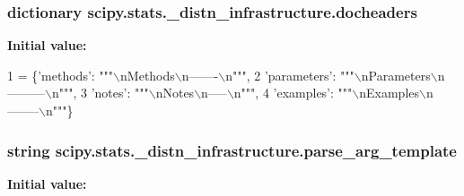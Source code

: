 \subsubsection[{docheaders}]{\setlength{\rightskip}{0pt plus 5cm}dictionary scipy.\+stats.\+\_\+distn\+\_\+infrastructure.\+docheaders}\label{namespacescipy_1_1stats_1_1__distn__infrastructure_aec447665e9947010e795781f414be00e}
{\bfseries Initial value\+:}
\begin{DoxyCode}
1 = \{\textcolor{stringliteral}{'methods'}: \textcolor{stringliteral}{"""\(\backslash\)nMethods\(\backslash\)n-------\(\backslash\)n"""},
2               \textcolor{stringliteral}{'parameters'}: \textcolor{stringliteral}{"""\(\backslash\)nParameters\(\backslash\)n---------\(\backslash\)n"""},
3               \textcolor{stringliteral}{'notes'}: \textcolor{stringliteral}{"""\(\backslash\)nNotes\(\backslash\)n-----\(\backslash\)n"""},
4               \textcolor{stringliteral}{'examples'}: \textcolor{stringliteral}{"""\(\backslash\)nExamples\(\backslash\)n--------\(\backslash\)n"""}\}
\end{DoxyCode}
\hypertarget{namespacescipy_1_1stats_1_1__distn__infrastructure_ac2177d4a1dbdfac6a0a97cfef94a72a2}{}
\subsubsection[{parse\+\_\+arg\+\_\+template}]{\setlength{\rightskip}{0pt plus 5cm}string scipy.\+stats.\+\_\+distn\+\_\+infrastructure.\+parse\+\_\+arg\+\_\+template}\label{namespacescipy_1_1stats_1_1__distn__infrastructure_ac2177d4a1dbdfac6a0a97cfef94a72a2}
{\bfseries Initial value\+:}
